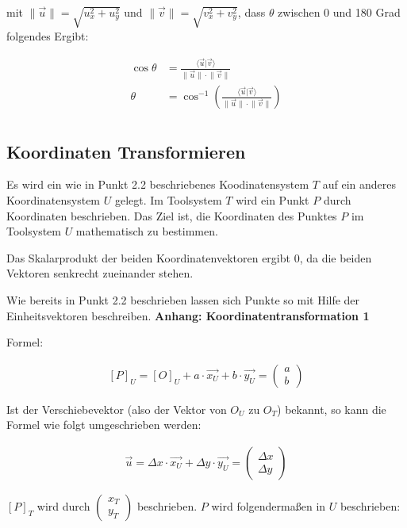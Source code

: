 \documentclass{article}
\newcommand{\m}[1]{\begin{pmatrix}#1\end{pmatrix}}
\begin{document}
    mit $\lVert \vec{u} \rVert = \sqrt{u_x^2 + u_y^2}$ und $\lVert \vec{v} \rVert = \sqrt{v_x^2 + v_y^2}$, dass $\theta$ zwischen 0 und 180 Grad folgendes Ergibt:
     
    \[
      \begin{split}
        \cos \theta &= \frac{\langle \vec{u} \vert \vec{v} \rangle}{\lVert \vec{u} \rVert \cdot \lVert \vec{v} \rVert} \\
        \theta &= \cos^{-1} \left ( \frac{\langle \vec{u} \vert \vec{v} \rangle}{\lVert \vec{u} \rVert \cdot \lVert \vec{v} \rVert} \right ) \\
      \end{split}  
    \]

    \subsection{Koordinaten Transformieren}

    Es wird ein wie in Punkt 2.2 beschriebenes Koodinatensystem $T$ auf ein anderes Koordinatensystem $U$ gelegt.
    Im Toolsystem $T$ wird ein Punkt $P$ durch Koordinaten beschrieben.
    Das Ziel ist, die Koordinaten des Punktes $P$ im Toolsystem $U$ mathematisch zu bestimmen.

    Das Skalarprodukt der beiden Koordinatenvektoren ergibt $0$, da die beiden Vektoren senkrecht zueinander stehen.

    Wie bereits in Punkt 2.2 beschrieben lassen sich Punkte so mit Hilfe der Einheitsvektoren
    beschreiben. \textbf{Anhang: Koordinatentransformation 1}

    Formel:

    \[
        \begin{split}
            {[P]}_{U} = {[O]}_{U} + a \cdot \vec{{x}_{U}} + b \cdot \vec{{y}_{U}} = \m{a \\ b}
        \end{split}
    \]

    Ist der Verschiebevektor (also der Vektor von $O_U$ zu $O_T$) bekannt,
    so kann die Formel wie folgt umgeschrieben werden:

    \[
        \begin{split}
            \vec{u} = \Delta x \cdot \vec{{x}_{U}} + \Delta y \cdot \vec{{y}_{U}} = \m{\Delta x \\ \Delta y}
        \end{split}
    \]

    ${[P]}_{T}$ wird durch $\m{x_T \\ y_T}$ beschrieben. $P$ wird folgendermaßen in $U$ beschrieben:
\end{document}
